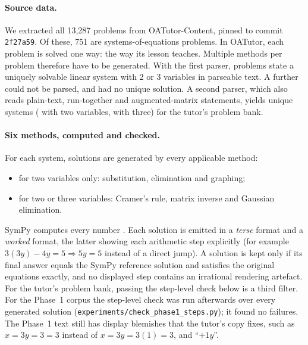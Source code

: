 \documentclass[11pt,a4paper]{article}
\begin{document}
\paragraph{Source data.}
We extracted all 13,287 problems from OATutor-Content, pinned to commit \texttt{2f27a59}. Of
these, 751 are systems-of-equations problems. In OATutor, each problem is solved one way: the
way its lesson teaches. Multiple methods per problem therefore have to be generated. With the
first parser, \numSystemsEmitted{} problems state a uniquely solvable linear system with 2
or 3 variables in parseable text. A further \numSkipUnparsed{} could not be parsed, and
\numSkipNoUnique{} had no unique solution. A second parser, which also reads plain-text,
run-together and augmented-matrix statements, yields \numBankProblems{} unique systems
(\numBankTwoVar{} with two variables, \numBankThreeVar{} with three) for the tutor's problem
bank.

\paragraph{Six methods, computed and checked.}
For each system, solutions are generated by every applicable method:
\begin{itemize}
  \item for two variables only: substitution, elimination and graphing;
  \item for two or three variables: Cramer's rule, matrix inverse and Gaussian elimination.
\end{itemize}
SymPy computes every number \citep{meurer2017sympy}. Each solution is emitted in a
\emph{terse} format and a \emph{worked} format, the latter showing each arithmetic step
explicitly (for example $3(3y)-4y=5 \Rightarrow 5y=5$ instead of a direct jump). A solution
is kept only if its final answer equals the SymPy reference solution and satisfies the
original equations exactly, and no displayed step contains an irrational rendering
artefact. For the tutor's problem bank, passing the step-level check below is a third
filter. For the Phase~1 corpus the step-level check was run afterwards over every generated
solution (\texttt{experiments/check\_phase1\_steps.py}); it found no failures. The Phase~1
text still has display blemishes that the tutor's copy fixes, such as $x=3y=3=3$ instead of
$x=3y=3(1)=3$, and ``$+1y$''.
\end{document}
